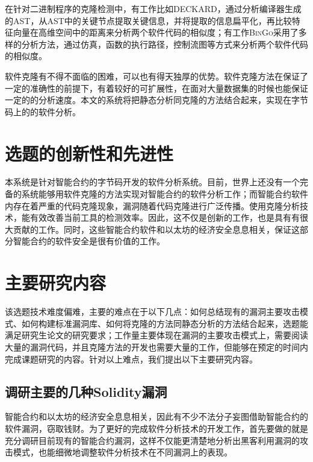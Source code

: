 在针对二进制程序的克隆检测中，有工作比如\textsc{DECKARD}\cite{deckard}，通过分析编译器生成的AST，从AST中的关键节点提取关键信息，并将提取的信息扁平化，再比较特征向量在高维空间中的距离来分析两个软件代码的相似度；有工作\textsc{BinGo}\cite{bingo}采用了多样的分析方法，通过仿真，函数的执行路径，控制流图等方式来分析两个软件代码的相似度。

软件克隆有不得不面临的困难，可以也有得天独厚的优势。软件克隆方法在保证了一定的准确性的前提下，有着较好的可扩展性，在面对大量数据集的时候也能保证一定的的分析速度。本文的系统将把静态分析同克隆的方法结合起来，实现在字节码上的的软件分析。

\section{选题的创新性和先进性}

本系统是针对智能合约的字节码开发的软件分析系统。目前，世界上还没有一个完备的系统能够用软件克隆的方法实现对智能合约的软件分析工作；而智能合约软件内存在着严重的代码克隆现象，漏洞随着代码克隆进行广泛传播。使用克隆分析技术，能有效改善当前工具的检测效率。因此，这不仅是创新的工作，也是具有有很大贡献的工作。同时，这些智能合约软件和以太坊的经济安全息息相关，保证这部分智能合约的软件安全是很有价值的工作。

\section{主要研究内容}

该选题技术难度偏难，主要的难点在于以下几点：如何总结现有的漏洞主要攻击模式、如何构建标准漏洞库、如何将克隆的方法同静态分析的方法结合起来，选题能满足研究生论文的研究要求；工作量主要体现在漏洞的主要攻击模式上，需要阅读大量的漏洞代码，并且克隆方法的开发也需要大量的工作，但能够在预定的时间内完成课题研究的内容。针对以上难点，我们提出以下主要研究内容。

\subsection{调研主要的几种Solidity漏洞}

智能合约和以太坊的经济安全息息相关，因此有不少不法分子妄图借助智能合约的软件漏洞，窃取钱财。为了更好的完成软件分析技术的开发工作，首先要做的就是充分调研目前现有的智能合约漏洞，这样不仅能更清楚地分析出黑客利用漏洞的攻击模式，也能细微地调整软件分析技术在不同漏洞上的表现。

